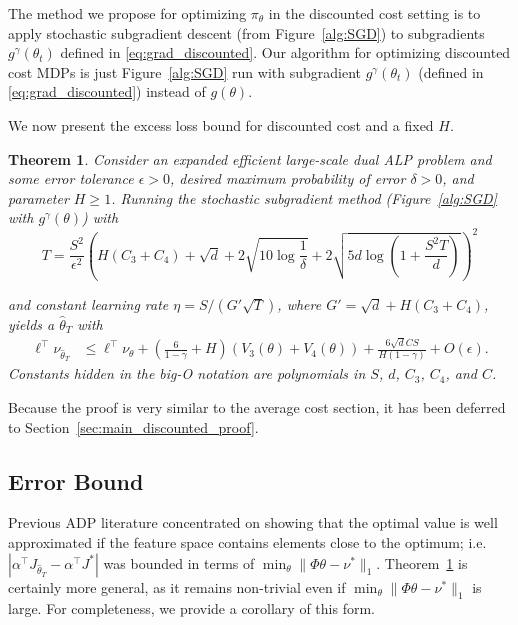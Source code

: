 \documentclass[11pt]{article}
\newtheorem{theorem}{Theorem}
\begin{document}
The method we propose for optimizing $\pi_\theta$ in the discounted cost setting is to apply stochastic subgradient descent (from Figure~\ref{alg:SGD}) to subgradients $g^\gamma(\theta_t)$ defined in \eqref{eq:grad_discounted}. 
Our algorithm for optimizing discounted cost MDPs is just Figure~\ref{alg:SGD} run with subgradient $g^\gamma(\theta_t)$ (defined in \eqref{eq:grad_discounted}) instead of $g(\theta)$. 


We now present the excess loss bound for discounted cost and a fixed $H$.
\begin{theorem}
\label{thm:main_discounted}
Consider an expanded efficient large-scale dual ALP problem and some error tolerance $\epsilon>0$, desired maximum probability of error $\delta>0$, and parameter $H\geq 1$. Running the stochastic subgradient method (Figure~\ref{alg:SGD} with $g^\gamma(\theta)$) with 
\begin{equation}
  \label{eq:discounted_min_T}
  T =
  \frac{S^2}{\epsilon^2}
  \left(H(C_3+C_4)+\sqrt{d}+2\sqrt{10 \log\frac{1}{\delta}}+2\sqrt{5d \log \left( 1 + \frac{S^2 T}{d} \right)}\right)^2
\end{equation}

and constant learning rate $\eta=S/(G'\sqrt{T})$, where $G' = \sqrt{d} + H (C_3 + C_4)$, yields a $\widehat \theta_T$ with
\begin{align*}
  \ell^{\top} \nu_{\widehat\theta_T}
  &\leq
    \ell^{\top} \nu_{\theta} +
    \left( \frac{6}{1-\gamma} + H \right)
    \left(V_3(\theta)+V_4(\theta)\right)
    +\frac{6\sqrt{d} CS}{H(1-\gamma)}+O(\epsilon).
\end{align*}
Constants hidden in the big-O notation are polynomials in $S$, $d$, $C_3$, $C_4$, and $C$.
\end{theorem}
Because the proof is very similar to the average cost section, it has been deferred to  Section~\ref{sec:main_discounted_proof}.

\subsection{Error Bound}
Previous ADP literature concentrated on showing that the optimal value is well approximated if the feature space contains elements close to the optimum; i.e.\  $| \alpha^\top J_{\widehat\theta_T} -\alpha^\top J^*|$ was bounded in terms of $\min_{\theta} \|\Phi\theta-\nu^*\|_1$. Theorem~\ref{thm:main_discounted} is certainly more general, as it remains non-trivial even if
$\min_{\theta} \|\Phi\theta-\nu^*\|_1$ is large. For completeness, we provide a corollary of this form.
\end{document}
